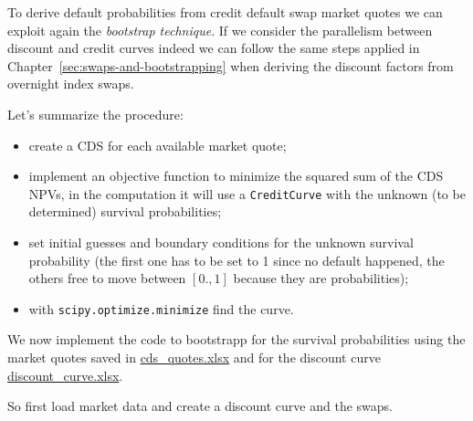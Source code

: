 To derive default probabilities from credit default swap market quotes we can exploit again the \emph{bootstrap technique}. If we consider the parallelism between discount and credit curves indeed we can follow the same steps applied in Chapter~\ref{sec:swaps-and-bootstrapping} when deriving the discount factors from overnight index swaps.

Let's summarize the procedure: 
\begin{itemize}
\tightlist
\item create a CDS for each available market quote;
\item implement an objective function to minimize the squared sum of the CDS NPVs, in the computation it will use a \texttt{CreditCurve} with the unknown (to be determined) survival probabilities;
\item set initial guesses and boundary conditions for the unknown survival probability (the first one has to be set to 1 since no default happened, the others free to move between $[0., 1]$ because they are probabilities);
\item with \texttt{scipy.optimize.minimize} find the curve.
\end{itemize}

We now implement the code to bootstrapp for the survival probabilities using the market quotes saved in \href{https://github.com/matteosan1/finance_course/raw/develop/libro/input_files/cds_quotes.xlsx}{cds\_quotes.xlsx} and for the discount curve \href{https://github.com/matteosan1/finance_course/blob/develop/libro/input_files/discount_curve.xlsx?raw=true}{discount\_curve.xlsx}.

So first load market data and create a discount curve and the swaps.

